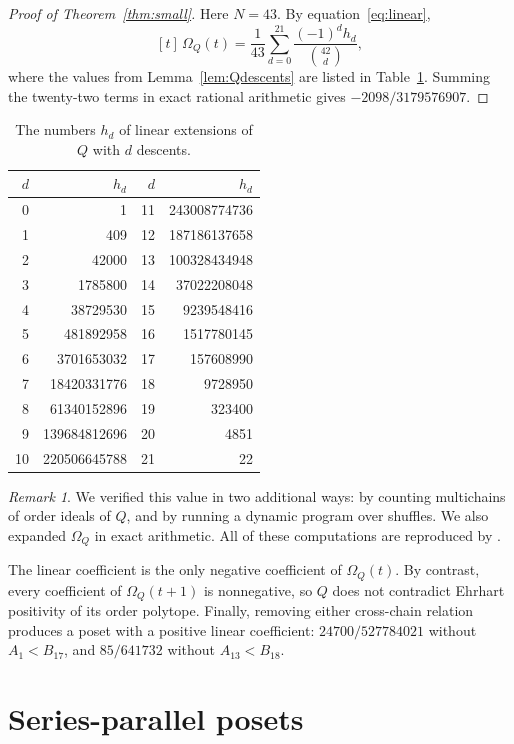 \documentclass[11pt]{amsart}
\theoremstyle{remark}
\newtheorem{remark}[theorem]{Remark}
\numberwithin{equation}{section}
\begin{document}
\begin{proof}[Proof of Theorem~\ref{thm:small}]
Here $N=43$. By equation~\eqref{eq:linear},
\[
 [t]\,\Omega_Q(t)=\frac1{43}\sum_{d=0}^{21}\frac{(-1)^dh_d}{\binom{42}{d}},
\]
where the values from Lemma~\ref{lem:Qdescents} are listed in
Table~\ref{tab:h}. Summing the twenty-two terms in exact rational arithmetic
gives $-2098/3179576907$.
\end{proof}

\begin{table}[ht]
\centering
\caption{The numbers $h_d$ of linear extensions of $Q$ with $d$ descents.}\label{tab:h}
\begin{tabular}{rrrr}
$d$ & $h_d$ & $d$ & $h_d$\\\hline
0 & 1 & 11 & 243008774736\\
1 & 409 & 12 & 187186137658\\
2 & 42000 & 13 & 100328434948\\
3 & 1785800 & 14 & 37022208048\\
4 & 38729530 & 15 & 9239548416\\
5 & 481892958 & 16 & 1517780145\\
6 & 3701653032 & 17 & 157608990\\
7 & 18420331776 & 18 & 9728950\\
8 & 61340152896 & 19 & 323400\\
9 & 139684812696 & 20 & 4851\\
10 & 220506645788 & 21 & 22
\end{tabular}
\end{table}

\begin{remark}
We verified this value in two additional ways: by counting multichains of order
ideals of $Q$, and by running a dynamic program over shuffles. We also expanded
$\Omega_Q$ in exact arithmetic. All of these computations are reproduced by
.

The linear coefficient is the only negative coefficient of $\Omega_Q(t)$. By
contrast, every coefficient of $\Omega_Q(t+1)$ is nonnegative, so $Q$ does not
contradict Ehrhart positivity of its order polytope. Finally, removing either
cross-chain relation produces a poset with a positive linear coefficient:
$24700/527784021$ without $A_1<B_{17}$, and $85/641732$ without
$A_{13}<B_{18}$.
\end{remark}

\section{Series-parallel posets}\label{sec:sp}
\end{document}
